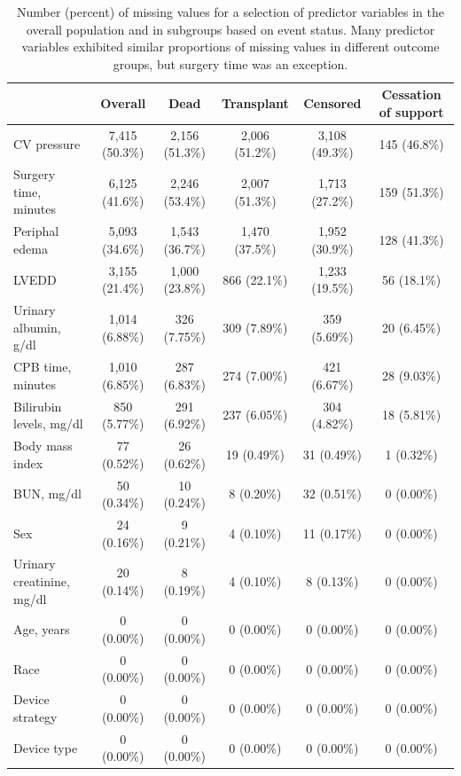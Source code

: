 \documentclass{article}
\begin{document}
\begin{table} 
 \caption{Number (percent) of missing values for a selection of predictor variables in the overall population and in subgroups based on event status. Many predictor variables exhibited similar proportions of missing values in different outcome groups, but surgery time was an exception.} 
\label{tbl_missingness} 
 
\begin{tabular}{lccccc}
\toprule
 & Overall & Dead & Transplant & Censored & Cessation of support \\ 
\midrule
CV pressure & 7,415 (50.3\%) & 2,156 (51.3\%) & 2,006 (51.2\%) & 3,108 (49.3\%) & 145 (46.8\%) \\ 
Surgery time, minutes & 6,125 (41.6\%) & 2,246 (53.4\%) & 2,007 (51.3\%) & 1,713 (27.2\%) & 159 (51.3\%) \\ 
Periphal edema & 5,093 (34.6\%) & 1,543 (36.7\%) & 1,470 (37.5\%) & 1,952 (30.9\%) & 128 (41.3\%) \\ 
LVEDD & 3,155 (21.4\%) & 1,000 (23.8\%) & 866 (22.1\%) & 1,233 (19.5\%) & 56 (18.1\%) \\ 
Urinary albumin, g/dl & 1,014 (6.88\%) & 326 (7.75\%) & 309 (7.89\%) & 359 (5.69\%) & 20 (6.45\%) \\ 
CPB time, minutes & 1,010 (6.85\%) & 287 (6.83\%) & 274 (7.00\%) & 421 (6.67\%) & 28 (9.03\%) \\ 
Bilirubin levels, mg/dl & 850 (5.77\%) & 291 (6.92\%) & 237 (6.05\%) & 304 (4.82\%) & 18 (5.81\%) \\ 
Body mass index & 77 (0.52\%) & 26 (0.62\%) & 19 (0.49\%) & 31 (0.49\%) & 1 (0.32\%) \\ 
BUN, mg/dl & 50 (0.34\%) & 10 (0.24\%) & 8 (0.20\%) & 32 (0.51\%) & 0 (0.00\%) \\ 
Sex & 24 (0.16\%) & 9 (0.21\%) & 4 (0.10\%) & 11 (0.17\%) & 0 (0.00\%) \\ 
Urinary creatinine, mg/dl & 20 (0.14\%) & 8 (0.19\%) & 4 (0.10\%) & 8 (0.13\%) & 0 (0.00\%) \\ 
Age, years & 0 (0.00\%) & 0 (0.00\%) & 0 (0.00\%) & 0 (0.00\%) & 0 (0.00\%) \\ 
Race & 0 (0.00\%) & 0 (0.00\%) & 0 (0.00\%) & 0 (0.00\%) & 0 (0.00\%) \\ 
Device strategy & 0 (0.00\%) & 0 (0.00\%) & 0 (0.00\%) & 0 (0.00\%) & 0 (0.00\%) \\ 
Device type & 0 (0.00\%) & 0 (0.00\%) & 0 (0.00\%) & 0 (0.00\%) & 0 (0.00\%) \\ 
\bottomrule
\end{tabular} 
 \end{table}
\end{document}
